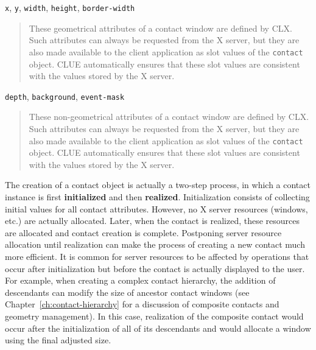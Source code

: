 \documentclass[twoside]{book}
\begin{document}
\begin{sloppy}
\begin{flushright}
{}\end{flushright}



\begin{flushright} \parbox[t]{6.125in}{
{\tt x}, {\tt y}, {\tt width}, {\tt height}, {\tt border-width}
\begin{quote}
These geometrical attributes of a contact window are defined by CLX. Such
attributes can always be requested from the X server, but they are also made
available to the client application as slot values of the {\tt contact}
object. CLUE automatically ensures that these slot values are consistent with
the values stored by the X server.
\end{quote}

}\end{flushright}

\begin{flushright} \parbox[t]{6.125in}{
{\tt depth}, {\tt background}, {\tt event-mask}
\begin{quote}
These non-geometrical attributes of a contact window are defined by CLX. Such
attributes can always be requested from the X server, but they are also made
available to the client application as slot values of the {\tt contact}
object. CLUE automatically ensures that these slot values are consistent with
the values stored by the X server.
\end{quote}

}\end{flushright}



The creation of a contact object is actually a two-step process, in which a
contact instance is first {\bf initialized} and 
then {\bf realized}. Initialization consists
of collecting initial values for all contact attributes. However, no X server
 resources (windows, etc.) are actually
allocated. Later, when the contact is realized,
these resources are allocated and contact creation is complete. Postponing
server resource allocation until realization can make the process of creating a
new contact much more efficient. It is common for server resources to be
affected by operations that occur after initialization but before the contact is
actually displayed to the user. For example, when creating a complex contact
hierarchy, the addition of descendants can modify the size of ancestor contact
windows (see Chapter~\ref{ch:contact-hierarchy} for a discussion of composite
contacts and geometry management). In this case, realization of the composite
contact would occur after the initialization of all of its descendants and would
allocate a window using the final adjusted size.


\end{sloppy}
\end{document}
